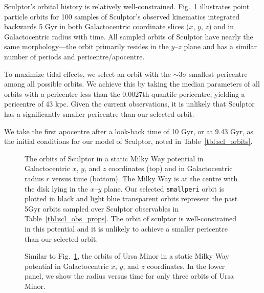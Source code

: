 Sculptor's orbital history is relatively well-constrained.
Fig.~\ref{fig:scl_orbits} illustrates point particle orbits for 100
samples of Sculptor's observed kinematics integrated backwards 5 Gyr in
both Galactocentric coordinate slices (\(x\), \(y\), \(z\)) and in
Galactocentric radius with time. All sampled orbits of Sculptor have
nearly the same morphology---the orbit primarily resides in the
\(y\)--\(z\) plane and has a similar number of periods and
pericentre/apocentre.

To maximize tidal effects, we select an orbit with the \(\sim 3\sigma\)
smallest pericentre among all possible orbits. We achieve this by taking
the median parameters of all orbits with a pericentre less than the
0.0027th quantile pericentre, yielding a pericentre of 43 kpc. Given the
current observations, it is unlikely that Sculptor has a significantly
smaller pericentre than our selected orbit.

We take the first apocentre after a look-back time of 10 Gyr, or at 9.43
Gyr, as the initial conditions for our model of Sculptor, noted in
Table~\ref{tbl:scl_orbits}.

\begin{figure}
\centering
{}
\caption[Sculptor Orbits]{The orbits of Sculptor in a static Milky Way
potential in Galactocentric \(x\), \(y\), and \(z\) coordinates (top)
and in Galactocentric radius \(r\) versus time (bottom). The Milky Way
is at the centre with the disk lying in the \(x\)--\(y\) plane. Our
selected \texttt{smallperi} orbit is plotted in black and light blue
transparent orbits represent the past 5Gyr orbits sampled over Sculptor
observables in Table~\ref{tbl:scl_obs_props}. The orbit of sculptor is
well-constrained in this potential and it is unlikely to achieve a
smaller pericentre than our selected orbit.}\label{fig:scl_orbits}
\end{figure}

\begin{figure}
\centering
{}
\caption[Ursa Minor Orbits]{Similar to Fig.~\ref{fig:scl_orbits}, the
orbits of Ursa Minor in a static Milky Way potential in Galactocentric
\(x\), \(y\), and \(z\) coordinates. In the lower panel, we show the
radius versus time for only three orbits of Ursa
Minor.}\label{fig:umi_orbits}
\end{figure}

